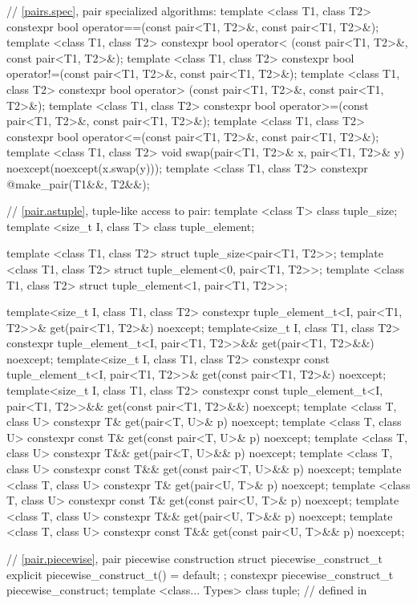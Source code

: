 \begin{codeblock}
{  // \ref{pairs.spec}, pair specialized algorithms:
  template <class T1, class T2>
    constexpr bool operator==(const pair<T1, T2>&, const pair<T1, T2>&);
  template <class T1, class T2>
    constexpr bool operator< (const pair<T1, T2>&, const pair<T1, T2>&);
  template <class T1, class T2>
    constexpr bool operator!=(const pair<T1, T2>&, const pair<T1, T2>&);
  template <class T1, class T2>
    constexpr bool operator> (const pair<T1, T2>&, const pair<T1, T2>&);
  template <class T1, class T2>
    constexpr bool operator>=(const pair<T1, T2>&, const pair<T1, T2>&);
  template <class T1, class T2>
    constexpr bool operator<=(const pair<T1, T2>&, const pair<T1, T2>&);
  template <class T1, class T2>
    void swap(pair<T1, T2>& x, pair<T1, T2>& y) noexcept(noexcept(x.swap(y)));
  template <class T1, class T2>
    constexpr @\seebelow@ make_pair(T1&&, T2&&);

  // \ref{pair.astuple}, tuple-like access to pair:
  template <class T> class tuple_size;
  template <size_t I, class T> class tuple_element;

  template <class T1, class T2> struct tuple_size<pair<T1, T2>>;
  template <class T1, class T2> struct tuple_element<0, pair<T1, T2>>;
  template <class T1, class T2> struct tuple_element<1, pair<T1, T2>>;

  template<size_t I, class T1, class T2>
    constexpr tuple_element_t<I, pair<T1, T2>>&
      get(pair<T1, T2>&) noexcept;
  template<size_t I, class T1, class T2>
    constexpr tuple_element_t<I, pair<T1, T2>>&&
      get(pair<T1, T2>&&) noexcept;
  template<size_t I, class T1, class T2>
    constexpr const tuple_element_t<I, pair<T1, T2>>&
      get(const pair<T1, T2>&) noexcept;
  template<size_t I, class T1, class T2>
    constexpr const tuple_element_t<I, pair<T1, T2>>&&
      get(const pair<T1, T2>&&) noexcept;
  template <class T, class U>
    constexpr T& get(pair<T, U>& p) noexcept;
  template <class T, class U>
    constexpr const T& get(const pair<T, U>& p) noexcept;
  template <class T, class U>
    constexpr T&& get(pair<T, U>&& p) noexcept;
  template <class T, class U>
    constexpr const T&& get(const pair<T, U>&& p) noexcept;
  template <class T, class U>
    constexpr T& get(pair<U, T>& p) noexcept;
  template <class T, class U>
    constexpr const T& get(const pair<U, T>& p) noexcept;
  template <class T, class U>
    constexpr T&& get(pair<U, T>&& p) noexcept;
  template <class T, class U>
    constexpr const T&& get(const pair<U, T>&& p) noexcept;

  // \ref{pair.piecewise}, pair piecewise construction
  struct piecewise_construct_t { explicit piecewise_construct_t() = default; };
  constexpr piecewise_construct_t piecewise_construct{};
  template <class... Types> class tuple;  // defined in 

}
\end{codeblock}
